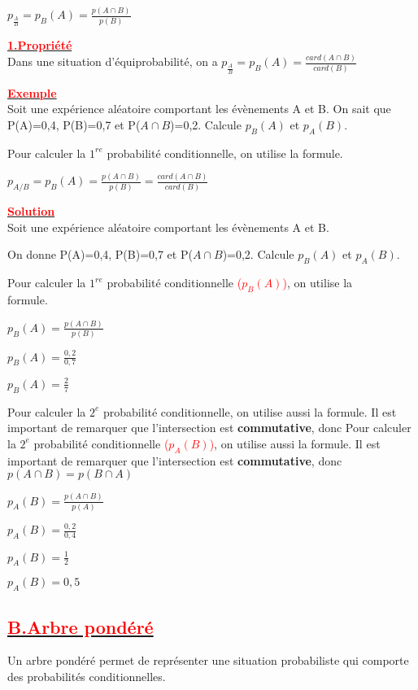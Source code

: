 \documentclass[12pt]{article}
\begin{document}
$p_{\frac{A}{B}}=p_{B}(A)=\frac{p(A\cap B)}{p(B)}$

\underline{\textbf{\textcolor{red}{1.Propriété}}}\\
Dans une situation d’équiprobabilité, on a $p_{\frac{A}{B}}=p_{B}(A)=\frac{card(A\cap B)}{card(B)}$

\underline{\textbf{\textcolor{red}{Exemple}}}\\
Soit une expérience aléatoire comportant les évènements A et B. On sait que
P(A)=0,4,  P(B)=0,7 et P($A\cap B$)=0,2. Calcule $p_{B}(A)$ et $p_{A}(B)$.

Pour calculer la $1^{re}$ probabilité conditionnelle, on utilise la formule.

$p_{A/B}=p_{B}(A)=\frac{p(A\cap B)}{p(B)}=\frac{card(A\cap B)}{card(B)}$

\underline{\textbf{\textcolor{red}{Solution}}}\\
Soit une expérience aléatoire comportant les évènements A et B.

On donne
P(A)=0,4,  P(B)=0,7 et P($A\cap B$)=0,2. Calcule $p_{B}(A)$ et $p_{A}(B)$.

Pour calculer la $1^{re}$ probabilité conditionnelle  \textcolor{red}{($p_{B}(A)$)}, on utilise la\\ formule.

$p_{B}(A)=\frac{p(A\cap B)}{p(B)}$

$p_{B}(A)=\frac{0,2}{0,7}$

$p_{B}(A)=\frac{2}{7}$

Pour calculer la $2^{e}$ probabilité conditionnelle, on utilise aussi la formule. Il est important de remarquer que l’intersection est \textbf{commutative}, donc 
Pour calculer la $2^{e}$ probabilité conditionnelle \textcolor{red}{($p_{A}(B)$)}, on utilise aussi la formule. Il est important de remarquer que l’intersection est \textbf{commutative}, donc 
$p(A\cap B)=p(B\cap A)$

$p_{A}(B)=\frac{p(A\cap B)}{p(A)}$

$p_{A}(B)=\frac{0,2}{0,4}$

$p_{A}(B)=\frac{1}{2}$

$p_{A}(B)=0,5$
\subsection*{\underline{\textbf{\textcolor{red}{B.Arbre pondéré}}}}
Un arbre pondéré permet de représenter une situation probabiliste qui comporte des probabilités conditionnelles.
\end{document}
